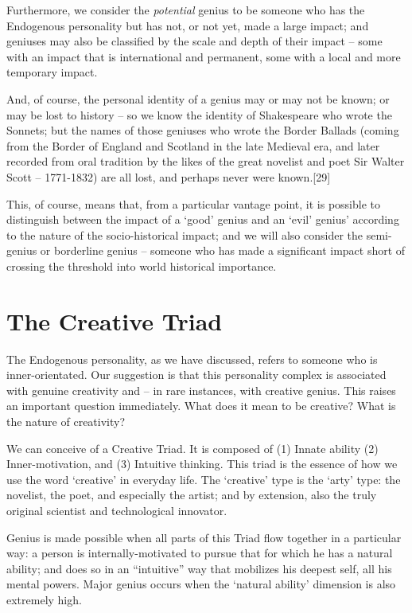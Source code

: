 \documentclass[
]{book}
\begin{document}
Furthermore, we consider the \emph{potential} genius to be someone who has the Endogenous personality but has not, or not yet, made a large impact; and geniuses may also be classified by the scale and depth of their impact -- some with an impact that is international and permanent, some with a local and more temporary impact.

And, of course, the personal identity of a genius may or may not be known; or may be lost to history -- so we know the identity of Shakespeare who wrote the Sonnets; but the names of those geniuses who wrote the Border Ballads (coming from the Border of England and Scotland in the late Medieval era, and later recorded from oral tradition by the likes of the great novelist and poet Sir Walter Scott -- 1771-1832) are all lost, and perhaps never were known.{[}29{]}

This, of course, means that, from a particular vantage point, it is possible to distinguish between the impact of a `good' genius and an `evil' genius' according to the nature of the socio-historical impact; and we will also consider the semi-genius or borderline genius -- someone who has made a significant impact short of crossing the threshold into world historical importance.

\hypertarget{the-creative-triad}{%
\chapter{The Creative Triad}\label{the-creative-triad}}

The Endogenous personality, as we have discussed, refers to someone who is inner-orientated. Our suggestion is that this personality complex is associated with genuine creativity and -- in rare instances, with creative genius. This raises an important question immediately. What does it mean to be creative? What is the nature of creativity?

We can conceive of a Creative Triad. It is composed of (1) Innate ability (2) Inner-motivation, and (3) Intuitive thinking. This triad is the essence of how we use the word `creative' in everyday life. The `creative' type is the `arty' type: the novelist, the poet, and especially the artist; and by extension, also the truly original scientist and technological innovator.

Genius is made possible when all parts of this Triad flow together in a particular way: a person is internally-motivated to pursue that for which he has a natural ability; and does so in an ``intuitive'' way that mobilizes his deepest self, all his mental powers. Major genius occurs when the `natural ability' dimension is also extremely high.
\end{document}

